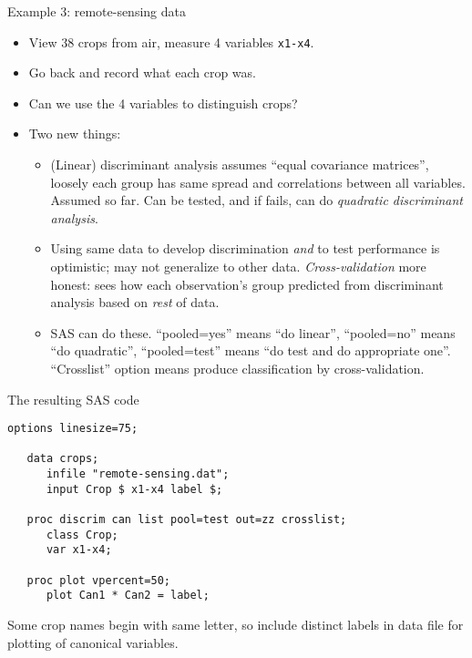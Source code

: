 \documentclass[pdf]{prosper}
\begin{document}
\begin{slide}{Example 3: remote-sensing data}
  \begin{itemize}
  \item View 38 crops from air, measure 4 variables \verb=x1-x4=.
  \item Go back and record what each crop was.
  \item Can we use the 4 variables to distinguish crops?
  \item Two new things:
    \begin{itemize}
    \item (Linear) discriminant analysis assumes ``equal covariance matrices'', loosely each group has same spread and correlations between all variables. Assumed so far. Can be tested, and if fails, can do {\em quadratic discriminant analysis}.
    \item Using same data to develop discrimination {\em and} to test performance is optimistic; may not generalize to other data. {\em Cross-validation} more honest: sees how each observation's group predicted from discriminant analysis based on {\em rest} of data.
    \item SAS can do these. ``pooled=yes'' means ``do linear'', ``pooled=no'' means ``do quadratic'', ``pooled=test'' means ``do test and do appropriate one''. ``Crosslist'' option means produce classification by cross-validation.
    \end{itemize}
  \end{itemize}
\end{slide}

\begin{slide}{The resulting SAS code}

\begin{verbatim}
options linesize=75;

   data crops; 
      infile "remote-sensing.dat";
      input Crop $ x1-x4 label $; 

   proc discrim can list pool=test out=zz crosslist; 
      class Crop; 
      var x1-x4; 

   proc plot vpercent=50;
      plot Can1 * Can2 = label;

\end{verbatim}

  Some crop names begin with same letter, so include distinct labels
  in data file for plotting of canonical variables.
  
\end{slide}
\end{document}
